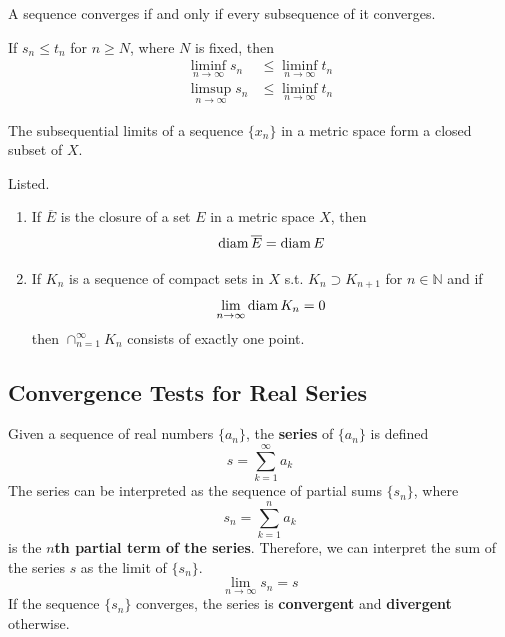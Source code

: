     \begin{corollary}
      A sequence converges if and only if every subsequence of it converges. 
    \end{corollary}

    \begin{theorem}
      If $s_n \leq t_n$ for $n \geq N$, where $N$ is fixed, then 
      \begin{align*}
        \liminf_{n \rightarrow \infty} s_n & \leq \liminf_{n \rightarrow \infty} t_n \\
        \limsup_{n \rightarrow \infty} s_n & \leq \liminf_{n \rightarrow \infty} t_n 
      \end{align*}
    \end{theorem}

    \begin{theorem}
      The subsequential limits of a sequence $\{x_n\}$ in a metric space form a closed subset of $X$. 
    \end{theorem}

    \begin{theorem}
      Listed. 
      \begin{enumerate}
        \item If $\overline{E}$ is the closure of a set $E$ in a metric space $X$, then 
        \[\operatorname{diam}{\overline{E}} = \operatorname{diam}{E}\]

        \item If $K_n$ is a sequence of compact sets in $X$ s.t. $K_n \supset K_{n+1}$ for $n \in \mathbb{N}$ and if 
        \[\lim_{n \rightarrow \infty} \operatorname{diam}{K_n} = 0\]
        then $\cap_{n=1}^\infty K_n$ consists of exactly one point. 
      \end{enumerate}
    \end{theorem}
    
  \subsection{Convergence Tests for Real Series}

    \begin{definition}
      Given a sequence of real numbers $\{a_n\}$, the \textbf{series} of $\{a_n\}$ is defined
      \begin{equation}
        s = \sum_{k=1}^\infty a_k
      \end{equation}
      The series can be interpreted as the sequence of partial sums $\{s_n\}$, where
      \begin{equation}
        s_n = \sum_{k=1}^n a_k
      \end{equation}
      is the \textbf{$n$th partial term of the series}. Therefore, we can interpret the sum of the series $s$ as the limit of $\{s_n\}$. 
      \begin{equation}
        \lim_{n \rightarrow \infty} s_n = s
      \end{equation}
      If the sequence $\{s_n\}$ converges, the series is \textbf{convergent} and \textbf{divergent} otherwise. 
    \end{definition}

